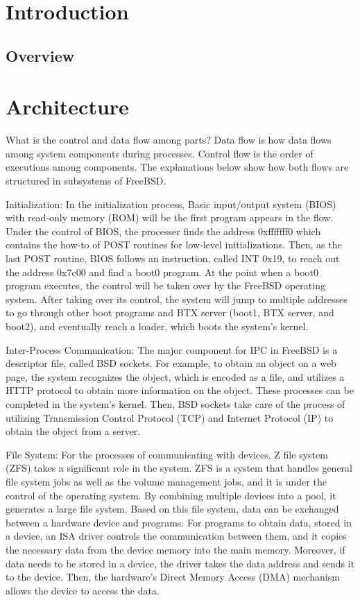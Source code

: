 \documentclass[12pt, dvipsnames, a4paper]{article}
\begin{document}
\section{Introduction}
\lipsum[1]

\subsection{Overview}
\lipsum[1]

\section{Architecture}


What is the control and data flow among parts?
Data flow is how data flows among system components during processes. Control flow is the order of executions among components. The explanations below show how both flows are structured in subsystems of FreeBSD.\par
Initialization: In the initialization process, Basic input/output system (BIOS) with read-only memory (ROM) will be the first program appears in the flow. Under the control of BIOS, the processer finds the address 0xfffffff0 which contains the how-to of POST routines for low-level initializations. Then, as the last POST routine, BIOS follows an instruction, called INT 0x19, to reach out the address 0x7c00 and find a boot0 program. At the point when a boot0 program executes, the control will be taken over by the FreeBSD operating system. After taking over its control, the system will jump to multiple addresses to go through other boot programs and BTX server (boot1, BTX server, and boot2), and eventually reach a loader, which boots the system’s kernel.\par
Inter-Process Communication: The major component for IPC in FreeBSD is a descriptor file, called BSD sockets. For example, to obtain an object on a web page, the system recognizes the object, which is encoded as a file, and utilizes a HTTP protocol to obtain more information on the object. These processes can be completed in the system’s kernel. Then, BSD sockets take care of the process of utilizing Transmission Control Protocol (TCP) and Internet Protocol (IP) to obtain the object from a server.\par
File System: For the processes of communicating with devices, Z file system (ZFS) takes a significant role in the system. ZFS is a system that handles general file system jobs as well as the volume management jobs, and it is under the control of the operating system. By combining multiple devices into a pool, it generates a large file system. Based on this file system, data can be exchanged between a hardware device and programs. For programs to obtain data, stored in a device, an ISA driver controls the communication between them, and it copies the necessary data from the device memory into the main memory. Moreover, if data needs to be stored in a device, the driver takes the data address and sends it to the device. Then, the hardware’s Direct Memory Access (DMA) mechanism allows the device to access the data.\par 
\end{document}

